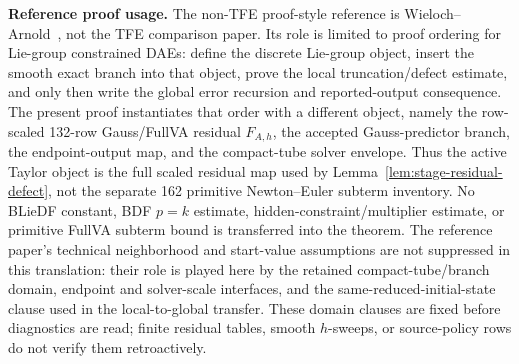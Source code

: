 \documentclass[preprint,12pt]{elsarticle}
\newcommand{\tfe}{TFE}
\begin{document}
\noindent\textbf{Reference proof usage.}
The non-\tfe{} proof-style reference is
Wieloch--Arnold~\cite{wieloch2021bdf}, not the \tfe{} comparison paper.  Its
role is limited to proof ordering for Lie-group constrained DAEs: define the
discrete Lie-group object, insert the smooth exact branch into that object,
prove the local truncation/defect estimate, and only then write the global
error recursion and reported-output consequence.  The present proof instantiates
that order with a different object, namely the row-scaled 132-row
Gauss/FullVA residual \(F_{A,h}\), the accepted Gauss-predictor branch, the
endpoint-output map, and the compact-tube solver envelope.  Thus the active
Taylor object is the full scaled residual map used by
Lemma~\ref{lem:stage-residual-defect}, not the separate 162 primitive
Newton--Euler subterm inventory.  No BLieDF constant, BDF \(p=k\) estimate,
hidden-constraint/multiplier estimate, or primitive FullVA subterm bound is
transferred into the theorem.
The reference paper's technical neighborhood and start-value assumptions are
not suppressed in this translation: their role is played here by the retained
compact-tube/branch domain, endpoint and solver-scale interfaces, and the
same-reduced-initial-state clause used in the local-to-global transfer.  These
domain clauses are fixed before diagnostics are read; finite residual tables,
smooth \(h\)-sweeps, or source-policy rows do not verify them retroactively.
\end{document}
